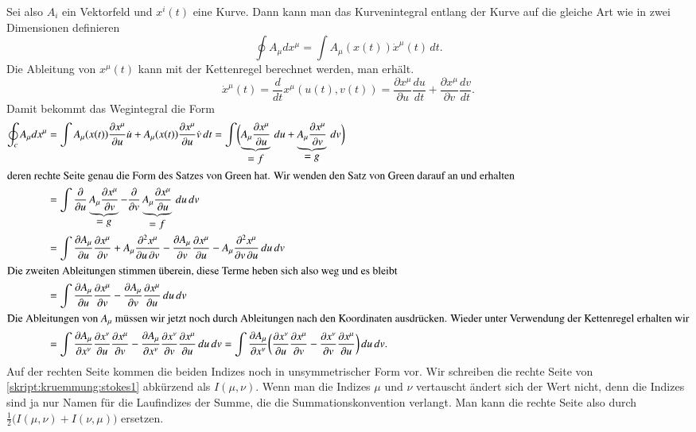 Sei also $A_i$ ein Vektorfeld und $x^i(t)$ eine Kurve.
Dann kann man das Kurvenintegral entlang der Kurve auf die gleiche Art
wie in zwei Dimensionen definieren
\[
\oint A_\mu dx^\mu = \int A_\mu(x(t)) \dot x^\mu(t)\,dt.
\]
Die Ableitung von $x^\mu(t)$ kann mit der Kettenregel berechnet
werden, man erhält.
\[
\dot x^\mu(t)
=
\frac{d}{dt} x^\mu(u(t), v(t))
=
\frac{\partial x^\mu}{\partial u} \frac{du}{dt}
+
\frac{\partial x^\mu}{\partial v} \frac{dv}{dt}.
\]
Damit bekommt das Wegintegral die Form
\begin{align}
\oint_c A_\mu dx^\mu
&=
\int
A_\mu(x(t))
\frac{\partial x^\mu}{\partial u}\dot u
+
A_\mu(x(t))
\frac{\partial x^\mu}{\partial u}\dot v
\,dt
=
\int
\biggl(
\underbrace{A_\mu \frac{\partial x^\mu}{\partial u}}_{\displaystyle=f}\,du
+
\underbrace{A_\mu \frac{\partial x^\mu}{\partial v}}_{\displaystyle=g}\,dv
\biggr)
\notag
\\
\intertext{%
deren rechte Seite genau die Form des Satzes von Green hat.
Wir wenden den Satz von Green darauf an und erhalten}
&=
\int
\frac{\partial}{\partial u}
\underbrace{A_\mu\frac{\partial x^\mu}{\partial v}}_{\displaystyle=g}
-
\frac{\partial}{\partial v}
\underbrace{A_\mu\frac{\partial x^\mu}{\partial u}}_{\displaystyle=f}
\,du\,dv
\notag
\\
&=
\int
\frac{\partial A_\mu}{\partial u}\frac{\partial x^\mu}{\partial v}
+A_\mu\frac{\partial^2 x^\mu}{\partial u\,\partial v}
-
\frac{\partial A_\mu}{\partial v}\frac{\partial x^\mu}{\partial u}
-A_\mu\frac{\partial^2 x^\mu}{\partial v\,\partial u}
\,du\,dv
\notag
\\
\intertext{Die zweiten Ableitungen stimmen überein, diese Terme heben
sich also weg und es bleibt}
&=
\int
\frac{\partial A_\mu}{\partial u}\frac{\partial x^\mu}{\partial v}
-
\frac{\partial A_\mu}{\partial v}\frac{\partial x^\mu}{\partial u}
\,du\,dv
\notag
\\
\intertext{Die Ableitungen von $A_\mu$ müssen wir jetzt noch durch
Ableitungen nach den Koordinaten ausdrücken.
Wieder unter Verwendung der Kettenregel erhalten wir}
&=
\int
\frac{\partial A_\mu}{\partial x^\nu}\frac{\partial x^\nu}{\partial u}\frac{\partial x^\mu}{\partial v}
-
\frac{\partial A_\mu}{\partial x^\nu}\frac{\partial x^\nu}{\partial v}\frac{\partial x^\mu}{\partial u}
\,du\,dv
=
\int
\frac{\partial A_\mu}{\partial x^\nu}
\biggl(\frac{\partial x^\nu}{\partial u}\frac{\partial x^\mu}{\partial v}
-
\frac{\partial x^\nu}{\partial v}\frac{\partial x^\mu}{\partial u}
\biggr)
\,du\,dv.
\label{skript:kruemmung:stokes1}
\end{align}
Auf der rechten Seite kommen die beiden Indizes noch in unsymmetrischer
Form vor.
Wir schreiben die rechte Seite von \eqref{skript:kruemmung:stokes1}
abkürzend als $I(\mu,\nu)$.
Wenn man die Indizes $\mu$ und $\nu$ vertauscht ändert sich der Wert nicht,
denn die Indizes sind ja nur Namen für die Laufindizes der Summe, die
die Summationskonvention verlangt.
Man kann die rechte Seite also durch
$\frac12\bigl(I(\mu,\nu)+I(\nu,\mu)\bigr)$
ersetzen.

